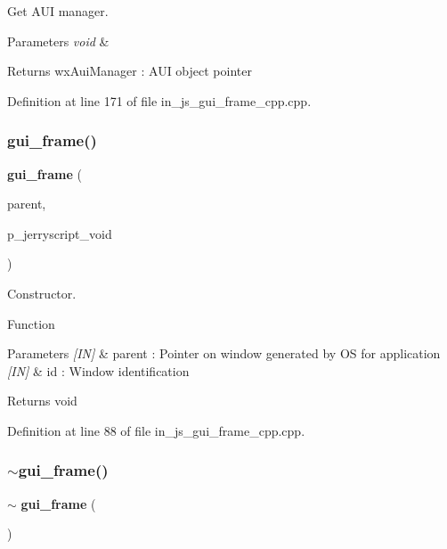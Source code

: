 Get A\+UI manager. 


\begin{DoxyParams}{Parameters}
{\em void} & \\
\hline
\end{DoxyParams}
\begin{DoxyReturn}{Returns}
wx\+Aui\+Manager \+: A\+UI object pointer 
\end{DoxyReturn}


Definition at line 171 of file in\+\_\+js\+\_\+gui\+\_\+frame\+\_\+cpp.\+cpp.

\mbox{\label{group___g_u_i_gae91f7141333a9416e48983245441a64a}} 
\subsubsection{gui\_frame()}
{\footnotesize\ttfamily \textbf{ gui\+\_\+frame} (\begin{DoxyParamCaption}\item[{wx\+Window $\ast$}]{parent,  }\item[{void $\ast$}]{p\+\_\+jerryscript\+\_\+void }\end{DoxyParamCaption})}



Constructor. 

Function
\begin{DoxyParams}{Parameters}
{\em \mbox{[}\+I\+N\mbox{]}} & parent \+: Pointer on window generated by OS for application \\
\hline
{\em \mbox{[}\+I\+N\mbox{]}} & id \+: Window identification \\
\hline
\end{DoxyParams}
\begin{DoxyReturn}{Returns}
void 
\end{DoxyReturn}


Definition at line 88 of file in\+\_\+js\+\_\+gui\+\_\+frame\+\_\+cpp.\+cpp.

\mbox{\label{group___g_u_i_ga32e813f8ed38407051e52cd80aab9895}} 
\subsubsection{$\sim$gui\_frame()}
{\footnotesize\ttfamily $\sim$\textbf{ gui\+\_\+frame} (\begin{DoxyParamCaption}{ }\end{DoxyParamCaption})\hspace{0.3cm}{\ttfamily [virtual]}}



